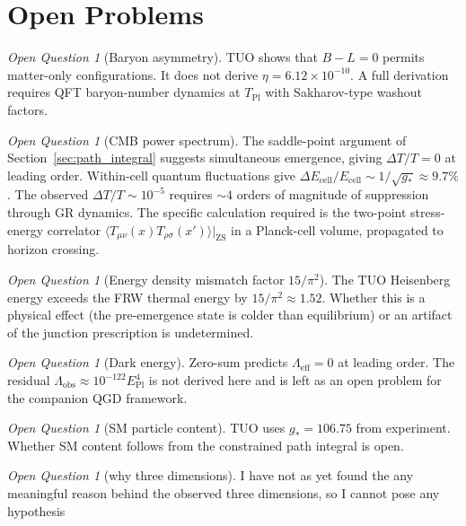 \documentclass[12pt,a4paper]{article}
\theoremstyle{definition}
\theoremstyle{remark}
\newtheorem{openq}[theorem]{Open Question}
\newcommand{\EPl}{E_{\mathrm{Pl}}}
\newcommand{\TPl}{T_{\mathrm{Pl}}}
\newcommand{\gstar}{g_{*}}
\begin{document}
\section{Open Problems}
\label{sec:open}

\begin{openq}[Baryon asymmetry]\label{oq:baryons}
TUO shows that $B - L = 0$ permits matter-only configurations.
It does not derive $\eta = 6.12\times10^{-10}$.
A full derivation requires QFT baryon-number dynamics at $\TPl$
with Sakharov-type washout factors.
\end{openq}

\begin{openq}[CMB power spectrum]\label{oq:cmb}
The saddle-point argument of Section~\ref{sec:path_integral} suggests
simultaneous emergence, giving $\Delta T/T = 0$ at leading order.
Within-cell quantum fluctuations give
$\Delta E_{\mathrm{cell}}/E_{\mathrm{cell}} \sim 1/\sqrt{\gstar} \approx 9.7\%$.
The observed $\Delta T/T \sim 10^{-5}$ requires $\sim 4$ orders of
magnitude of suppression through GR dynamics.
The specific calculation required is the two-point stress-energy
correlator $\langle T_{\mu\nu}(x)T_{\rho\sigma}(x')\rangle|_{\mathrm{ZS}}$
in a Planck-cell volume, propagated to horizon crossing.
\end{openq}

\begin{openq}[Energy density mismatch factor $15/\pi^2$]\label{oq:factor}
The TUO Heisenberg energy exceeds the FRW thermal energy by $15/\pi^2 \approx 1.52$.
Whether this is a physical effect (the pre-emergence state is colder than
equilibrium) or an artifact of the junction prescription is undetermined.
\end{openq}

\begin{openq}[Dark energy]\label{oq:lambda}
Zero-sum predicts $\Lambda_\mathrm{eff} = 0$ at leading order.
The residual $\Lambda_\mathrm{obs} \approx 10^{-122}\EPl^4$ is not derived
here and is left as an open problem for the companion QGD framework.
\end{openq}

\begin{openq}[SM particle content]\label{oq:sm}
TUO uses $\gstar = 106.75$ from experiment.
Whether SM content follows from the constrained path integral is open.
\end{openq}

\begin{openq}[why three dimensions]\label{oq:sm}
I have not as yet found the any meaningful reason behind the observed
three dimensions, so I cannot pose any hypothesis
\end{openq}
\end{document}
